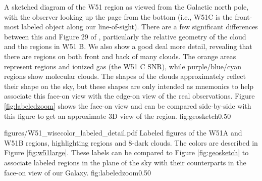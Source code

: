 {A sketched diagram of the W51 region as viewed from the Galactic north pole,
with the observer looking up the page from the bottom (i.e., W51C is the 
front-most labeled object along our line-of-sight).  There are a few
significant differences between this and Figure 29 of \citet{Kang2010a},
particularly the relative geometry of the cloud and the \hii regions in W51 B.
We also show a good deal more detail, revealing that there are \hii regions on
both front and back of many clouds.
The orange areas represent \hii regions and ionized gas (the W51 C SNR), while
purple/blue/cyan regions show molecular clouds.
The shapes of the clouds approximately reflect their shape on the sky, but these
shapes are only intended as mnemonics to help associate this face-on view with
the edge-on view of the real observations.
Figure \ref{fig:labeledzoom} shows the face-on view and can be compared
side-by-side with this figure to get an approximate 3D view of the region.
}
{fig:geosketch}{0.5}{0}

\Figure
{figures/W51_wisecolor_labeled_detail.pdf}
{Labeled figures of the W51A and W51B regions, highlighting \hii regions and
8\um-dark clouds.   The colors are described in Figure \ref{fig:w51large}.
These labels can be compared to Figure \ref{fig:geosketch} to associate labeled
regions in the plane of the sky with their counterparts in the face-on view of
our Galaxy.}
{fig:labeledzoom}{0.5}{0}






